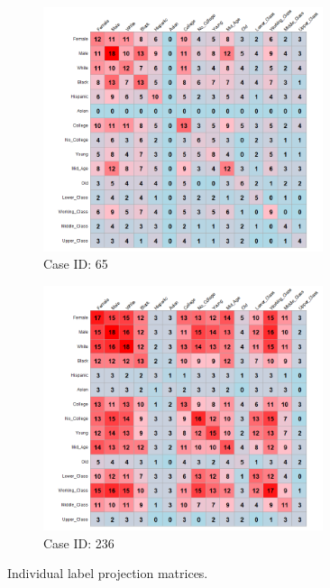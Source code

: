 \documentclass[12pt]{article}
\begin{document}
\begin{figure}[ht!]
    \captionsetup[subfigure]{font=footnotesize,labelfont=footnotesize}
    \centering
     \begin{subfigure}[b]{0.49\textwidth}
        \includegraphics[trim={1cm 0cm 0cm 0cm},clip, width=0.9\textwidth]{Plots/data-ex-cp1.png}
            \caption{Case ID: 65}
            \label{fig:ind-ex-cp1}
    \end{subfigure}
     \begin{subfigure}[b]{0.49\textwidth}
        \includegraphics[trim={1cm 0cm 0cm 0cm},clip, width=0.9\textwidth]{Plots/data-ex-cp2.png}
            \caption{Case ID: 236}
            \label{fig:ind-ex-cp2}
    \end{subfigure}
    \caption{Individual label projection matrices.}
    \label{fig:ind-ex-cp}
\end{figure}
\end{document}
